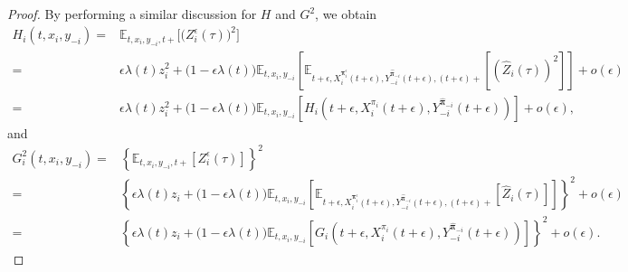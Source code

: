 \documentclass[11pt]{article}
\numberwithin{equation}{section}
\newcommand{\bpi}{\boldsymbol{\pi}}
\providecommand{\smn}{{-}} %
\begin{document}
\begin{proof}
		By performing a similar discussion for \( H \) and \( G^2 \), we obtain
		\begin{align*}
			H_i(t,x_i,y_{\smn i})
			=&\mathbb{E}_{t,x_i,y_{\smn i},t+}\big[\big(Z_i^\epsilon(\tau)\big)^2\big]\\
			=&\epsilon \lambda(t)z_i^2+\big(1-\epsilon \lambda(t)\big)\mathbb{E}_{t,x_i,y_{\smn i}}\left[\mathbb{E}_{t+\epsilon,X_i^{{\bm{\pi}}^\epsilon_i}(t+\epsilon),Y^{\widehat{\bpi}_{\smn i}}_{\smn i}(t+\epsilon),(t+\epsilon)+} \left[\left(\widehat{Z}_i(\tau)\right)^2\right]\right]+o(\epsilon)\\
			=&\epsilon \lambda(t)z_i^2+\big(1-\epsilon \lambda(t)\big)\mathbb{E}_{t,x_i,y_{\smn i}}\left[H_i\left(t+\epsilon,X^{\pi_i}_i(t+\epsilon),Y^{\widehat{\bpi}_{\smn i}}_{\smn i}(t+\epsilon)\right)\right]+o(\epsilon),
		\end{align*}
		and
		\begin{align*}
			G_i^2(t,x_i,y_{\smn i})
			=&\left\{\mathbb{E}_{t,x_i,y_{\smn i},t+}\left[ Z_i^\epsilon(\tau)\right]\right\}^2\\
			=&\left\{\epsilon \lambda(t)z_i+\big(1-\epsilon\lambda(t)\big)\mathbb{E}_{t,x_i,y_{\smn i}}\left[\mathbb{E}_{t+\epsilon,X_i^{{\bm{\pi}}_i^\epsilon}(t+\epsilon),Y^{\widehat{\bpi}_{\smn i}}_{\smn i}(t+\epsilon),(t+\epsilon)+} \left[\widehat{Z}_i(\tau)\right]\right]\right\}^2+o(\epsilon)\\
			=&\left\{\epsilon \lambda(t)z_i+\big(1-\epsilon\lambda(t)\big)\mathbb{E}_{t,x_i,y_{\smn i}}\left[G_i\left(t+\epsilon,X^{\pi_i}_i(t+\epsilon),Y^{\widehat{\bpi}_{\smn i}}_{\smn i}(t+\epsilon)\right)\right]\right\}^2+o(\epsilon).
		\end{align*}
		

\end{proof}
\end{document}
